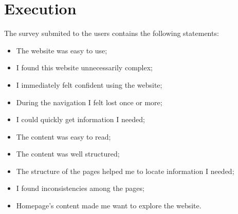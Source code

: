 \documentclass[../../UsabilityReport.tex]{subfiles}
\begin{document}
\section{Execution}
	The survey submited to the users contains the following statements:
	\begin{itemize}
		\item The website was easy to use;
		\item I found this website unnecessarily complex;
		\item I immediately felt confident using the website;
		\item During the navigation I felt lost once or more;
		\item I could quickly get information I needed;
		\item The content was easy to read;
		\item The content was well structured;
		\item The structure of the pages helped me to locate information I needed;
		\item I found inconsistencies among the pages;
		\item Homepage’s content made me want to explore the website.
	\end{itemize}
\end{document}
